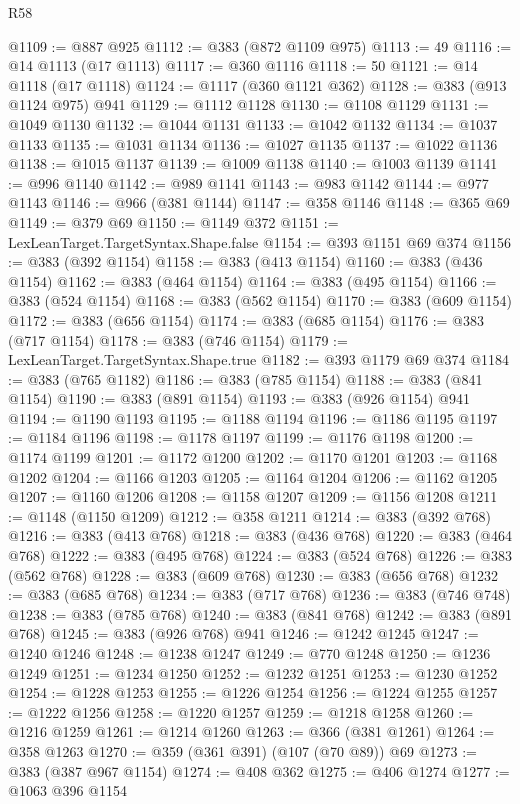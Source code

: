 \begin{lexlean}{R58}
\begin{coremodule}
@1109 := @887 @925
@1112 := @383 (@872 @1109 @975)
@1113 := 49
@1116 := @14 @1113 (@17 @1113)
@1117 := @360 @1116
@1118 := 50
@1121 := @14 @1118 (@17 @1118)
@1124 := @1117 (@360 @1121 @362)
@1128 := @383 (@913 @1124 @975) @941
@1129 := @1112 @1128
@1130 := @1108 @1129
@1131 := @1049 @1130
@1132 := @1044 @1131
@1133 := @1042 @1132
@1134 := @1037 @1133
@1135 := @1031 @1134
@1136 := @1027 @1135
@1137 := @1022 @1136
@1138 := @1015 @1137
@1139 := @1009 @1138
@1140 := @1003 @1139
@1141 := @996 @1140
@1142 := @989 @1141
@1143 := @983 @1142
@1144 := @977 @1143
@1146 := @966 (@381 @1144)
@1147 := @358 @1146
@1148 := @365 @69
@1149 := @379 @69
@1150 := @1149 @372
@1151 := LexLeanTarget.TargetSyntax.Shape.false
@1154 := @393 @1151 @69 @374
@1156 := @383 (@392 @1154)
@1158 := @383 (@413 @1154)
@1160 := @383 (@436 @1154)
@1162 := @383 (@464 @1154)
@1164 := @383 (@495 @1154)
@1166 := @383 (@524 @1154)
@1168 := @383 (@562 @1154)
@1170 := @383 (@609 @1154)
@1172 := @383 (@656 @1154)
@1174 := @383 (@685 @1154)
@1176 := @383 (@717 @1154)
@1178 := @383 (@746 @1154)
@1179 := LexLeanTarget.TargetSyntax.Shape.true
@1182 := @393 @1179 @69 @374
@1184 := @383 (@765 @1182)
@1186 := @383 (@785 @1154)
@1188 := @383 (@841 @1154)
@1190 := @383 (@891 @1154)
@1193 := @383 (@926 @1154) @941
@1194 := @1190 @1193
@1195 := @1188 @1194
@1196 := @1186 @1195
@1197 := @1184 @1196
@1198 := @1178 @1197
@1199 := @1176 @1198
@1200 := @1174 @1199
@1201 := @1172 @1200
@1202 := @1170 @1201
@1203 := @1168 @1202
@1204 := @1166 @1203
@1205 := @1164 @1204
@1206 := @1162 @1205
@1207 := @1160 @1206
@1208 := @1158 @1207
@1209 := @1156 @1208
@1211 := @1148 (@1150 @1209)
@1212 := @358 @1211
@1214 := @383 (@392 @768)
@1216 := @383 (@413 @768)
@1218 := @383 (@436 @768)
@1220 := @383 (@464 @768)
@1222 := @383 (@495 @768)
@1224 := @383 (@524 @768)
@1226 := @383 (@562 @768)
@1228 := @383 (@609 @768)
@1230 := @383 (@656 @768)
@1232 := @383 (@685 @768)
@1234 := @383 (@717 @768)
@1236 := @383 (@746 @748)
@1238 := @383 (@785 @768)
@1240 := @383 (@841 @768)
@1242 := @383 (@891 @768)
@1245 := @383 (@926 @768) @941
@1246 := @1242 @1245
@1247 := @1240 @1246
@1248 := @1238 @1247
@1249 := @770 @1248
@1250 := @1236 @1249
@1251 := @1234 @1250
@1252 := @1232 @1251
@1253 := @1230 @1252
@1254 := @1228 @1253
@1255 := @1226 @1254
@1256 := @1224 @1255
@1257 := @1222 @1256
@1258 := @1220 @1257
@1259 := @1218 @1258
@1260 := @1216 @1259
@1261 := @1214 @1260
@1263 := @366 (@381 @1261)
@1264 := @358 @1263
@1270 := @359 (@361 @391) (@107 (@70 @89)) @69
@1273 := @383 (@387 @967 @1154)
@1274 := @408 @362
@1275 := @406 @1274
@1277 := @1063 @396 @1154

\end{coremodule}
\end{lexlean}
